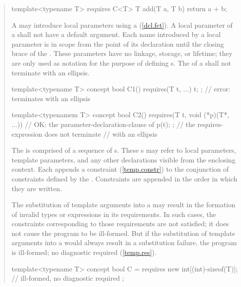 \begin{quote}
\begin{codeblock}
template<typename T> requires C<T> 
  T add(T a, T b) { return a + b; }
\end{codeblock}
\exitnote

\pnum
A  may introduce local parameters using a
(\ref{dcl.fct}). 
%
A local parameter of a  shall not have a 
default argument.
%
Each name introduced by a local parameter is in scope from the point
of its declaration until the closing brace of the
.
%
These parameters have no linkage, storage, or lifetime; they are only used
as notation for the purpose of defining s.
%
The  of a 
 shall
not terminate with an ellipsis.
\enterexample
\begin{codeblock}
template<typename T>
  concept bool C1() { 
    requires(T t, ...) { t; }; // error: terminates with an ellipsis
  }

template<typenamem T>
  concept bool C2() { 
    requires(T t, void (*p)(T*, ...)) // OK: the parameter-declaration-clause of
    { p(t); };                        // the requires-expression does not terminate 
  }                                   // with an ellipsis
\end{codeblock}
\exitexample

\pnum
The  is comprised of 
a sequence of s.
%
These s may refer to local 
parameters, template parameters, and any other declarations visible from the 
enclosing context. 
%
Each  appends a constraint (\ref{temp.constr}) to 
the conjunction of constraints defined by the
. Constraints are appended in the order
in which they are written.

\pnum
The substitution of template arguments into a  
may result in the formation of  invalid types or expressions in its
requirements. In such cases, the constraints corresponding to those
requirements are not satisfied; it does not cause the program to be ill-formed.
%
\enternote
But if the substitution of template arguments into
a  would always result in
a substitution failure, the program is ill-formed; no diagnostic
required (\ref{temp.res}).
\exitnote
%
\enterexample
\begin{codeblock}
template<typename T> concept bool C =
  requires {
    new int[(int)-sizeof(T)]; // ill-formed, no diagnostic required
  };
\end{codeblock}
\exitexample



\end{quote}
